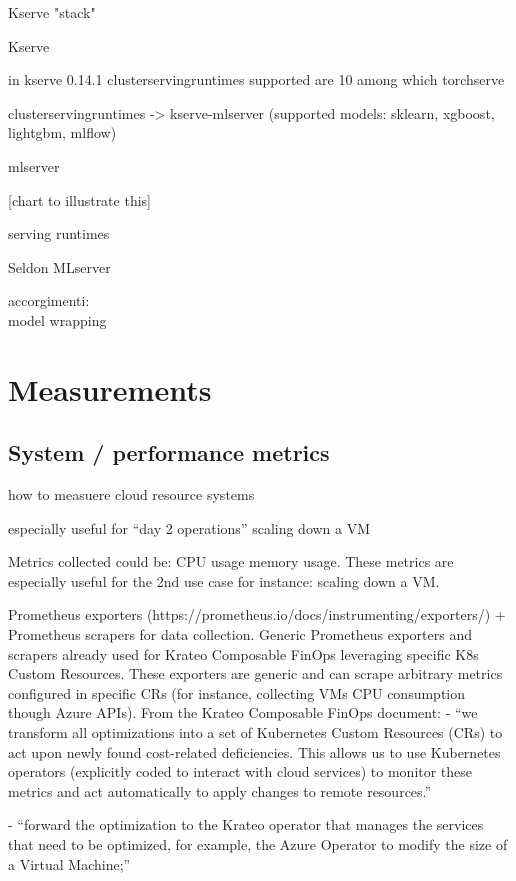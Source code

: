 Kserve "stack"

Kserve

in kserve 0.14.1
clusterservingruntimes
supported are 10
among which 
torchserve

clusterservingruntimes -> kserve-mlserver (supported models: sklearn, xgboost, lightgbm, mlflow)

mlserver




[chart to illustrate this]



serving runtimes

Seldon MLserver


accorgimenti: \\
model wrapping


\newpage

\section{Measurements}




\subsection{System / performance metrics}


how to measuere cloud resource systems


especially useful for ``day 2 operations''
scaling down a VM


Metrics collected could be:
CPU usage
memory usage.
These metrics are especially useful for the 2nd use case for instance: scaling down a VM.


Prometheus exporters (https://prometheus.io/docs/instrumenting/exporters/) + Prometheus scrapers for data collection.
Generic Prometheus exporters and scrapers already used for Krateo Composable FinOps leveraging specific K8s Custom Resources. These exporters are generic and can scrape arbitrary metrics configured in specific CRs (for instance, collecting VMs CPU consumption though Azure APIs).
From the Krateo Composable FinOps document: 
- “we transform all optimizations into a set of Kubernetes Custom Resources (CRs) to act upon newly found cost-related deficiencies. This allows us to use Kubernetes operators (explicitly coded to interact with cloud services) to monitor these metrics and act automatically to apply changes to remote resources.”

- “forward the optimization to the Krateo operator that manages the services that need to be optimized, for example, the Azure Operator to modify the size of a Virtual Machine;”


